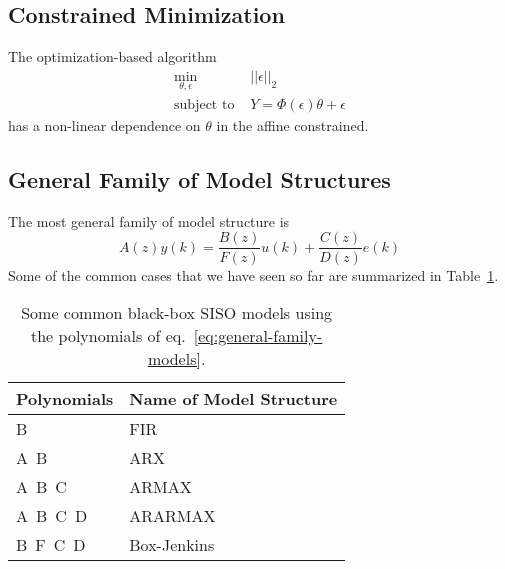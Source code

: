 \subsection{Constrained Minimization}
\label{sec:ARMAX-minimization}

The optimization-based algorithm
\begin{equation*}
  \begin{aligned}
    \min_{\theta,\epsilon}\ & ||\epsilon||_2 \\
    \textrm{subject to } & Y = \Phi(\epsilon)\theta + \epsilon
  \end{aligned}
\end{equation*}
has a non-linear dependence on $\theta$ in the affine constrained.


\subsection{General Family of Model Structures}
\label{sec:general-family-models}

The most general family of model structure is~\cite[Sect.~4]{ljung}
\begin{equation}
  \label{eq:general-family-models}
  A(z)y(k) = \frac{B(z)}{F(z)}u(k) + \frac{C(z)}{D(z)}e(k)
\end{equation}
Some of the common cases that we have seen so far are summarized in Table~\ref{tbl:black-box-models}.

\begin{table}[h]
  \centering
  \begin{tabular}[h]{ll}
    \toprule
    Polynomials & Name of Model Structure \\
    \midrule
    B & FIR \\
    A\ B & ARX \\
    A\ B\ C & ARMAX \\
    A\ B\ C\ D & ARARMAX \\
    B\ F\ C\ D & Box-Jenkins \\
    \bottomrule
  \end{tabular}
  \caption{Some common black-box SISO models using the polynomials of eq.~\eqref{eq:general-family-models}.}
  \label{tbl:black-box-models}
\end{table}

